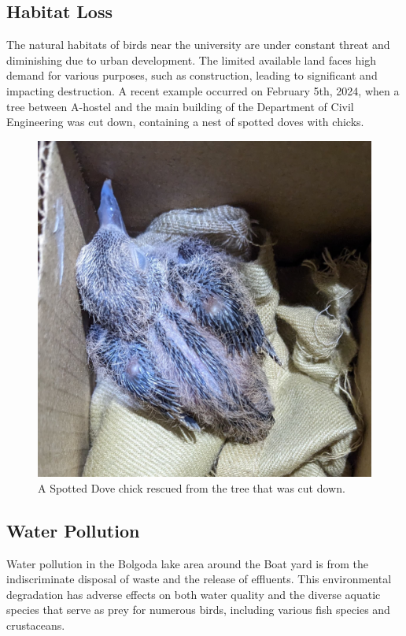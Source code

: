 \subsection{Habitat Loss}
The natural habitats of birds near the university are under constant threat and diminishing due to urban development. The limited available land faces high demand for various purposes, such as construction, leading to significant and impacting destruction. A recent example occurred on February 5th, 2024, when a tree between A-hostel and the main building of the Department of Civil Engineering was cut down, containing a nest of spotted doves with chicks.
    \begin{figure}[!htpb]
        \centering
        \includegraphics[width=\linewidth]{Figures/spotted-dove-chick.jpg}
        \caption[]{A Spotted Dove chick rescued from the tree that was cut down.}
        \label{fig:figure-01}
    \end{figure}

\subsection{Water Pollution}
Water pollution in the Bolgoda lake area around the Boat yard is from the indiscriminate disposal of waste and the release of effluents. This environmental degradation has adverse effects on both water quality and the diverse aquatic species that serve as prey for numerous birds, including various fish species and crustaceans.
